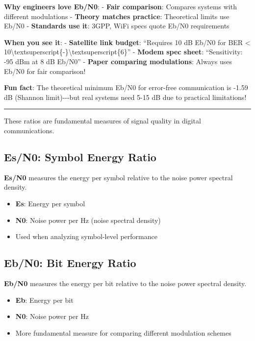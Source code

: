 \textbf{Why engineers love Eb/N0}: - \textbf{Fair comparison}: Compares
systems with different modulations - \textbf{Theory matches practice}:
Theoretical limits use Eb/N0 - \textbf{Standards use it}: 3GPP, WiFi
specs quote Eb/N0 requirements

\textbf{When you see it}: - \textbf{Satellite link budget}: ``Requires
10 dB Eb/N0 for BER \textless{}
10\textbackslash textsuperscript\{-\}\textbackslash textsuperscript\{6\}''
- \textbf{Modem spec sheet}: ``Sensitivity: -95 dBm at 8 dB Eb/N0'' -
\textbf{Paper comparing modulations}: Always uses Eb/N0 for fair
comparison!

\textbf{Fun fact}: The theoretical minimum Eb/N0 for error-free
communication is -1.59 dB (Shannon limit)-\/-\/-but real systems need
5-15 dB due to practical limitations!

\begin{center}\rule{0.5\linewidth}{0.5pt}\end{center}

These ratios are fundamental measures of signal quality in digital
communications.

\subsection{Es/N0: Symbol Energy Ratio}\label{esn0-symbol-energy-ratio}

\textbf{Es/N0} measures the energy per symbol relative to the noise
power spectral density.

\begin{itemize}
\tightlist
\item
  \textbf{Es}: Energy per symbol
\item
  \textbf{N0}: Noise power per Hz (noise spectral density)
\item
  Used when analyzing symbol-level performance
\end{itemize}

\subsection{Eb/N0: Bit Energy Ratio}\label{ebn0-bit-energy-ratio}

\textbf{Eb/N0} measures the energy per bit relative to the noise power
spectral density.

\begin{itemize}
\tightlist
\item
  \textbf{Eb}: Energy per bit\\
\item
  \textbf{N0}: Noise power per Hz
\item
  More fundamental measure for comparing different modulation schemes
\end{itemize}

